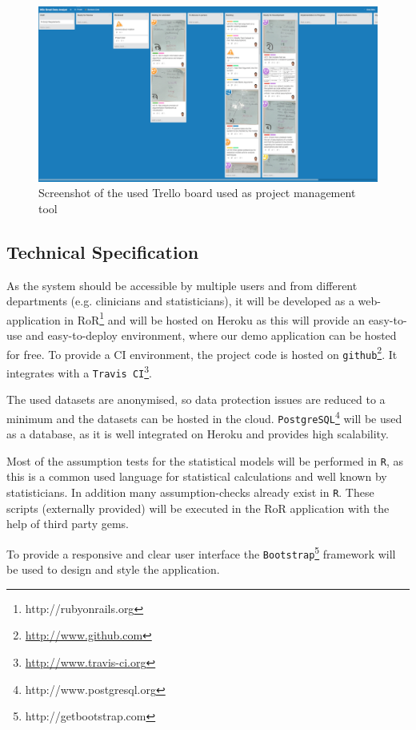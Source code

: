 \begin{figure}[h]
\centering
	\includegraphics[page=1,width=\textwidth]{figures/trello}
\caption{Screenshot of the used Trello board used as project management tool}
\label{fig:trello}
\end{figure}


\subsection{Technical Specification}
\label{sub:technical}

As the system should be accessible by multiple users and from different departments (e.g. clinicians and statisticians), it will be developed as a web-application in \gls{RoR}\footnote{http://rubyonrails.org} and will be hosted on \gls{Heroku} as this will provide an easy-to-use and easy-to-deploy environment, where our demo application can be hosted for free. To provide a \gls{CI} environment, the project code is hosted on \texttt{github}\footnote{\href{http://www.github.com}{http://www.github.com}}. It integrates with a \texttt{Travis CI}\footnote{\href{http://www.travis-ci.org}{http://www.travis-ci.org} }.

The used datasets are anonymised, so data protection issues are reduced to a minimum and the datasets can be hosted in the cloud. \texttt{PostgreSQL}\footnote{http://www.postgresql.org} will be used as a database, as it is well integrated on \gls{Heroku} and provides high scalability.

Most of the assumption tests for the statistical models will be performed in \texttt{R}, as this is a common used language for statistical calculations and well known by statisticians. In addition many assumption-checks already exist in \texttt{R}. These scripts (externally provided) will be executed in the \gls{RoR} application with the help of third party gems.

To provide a responsive and clear user interface the \texttt{Bootstrap}\footnote{http://getbootstrap.com} framework will be used to design and style the application. 


